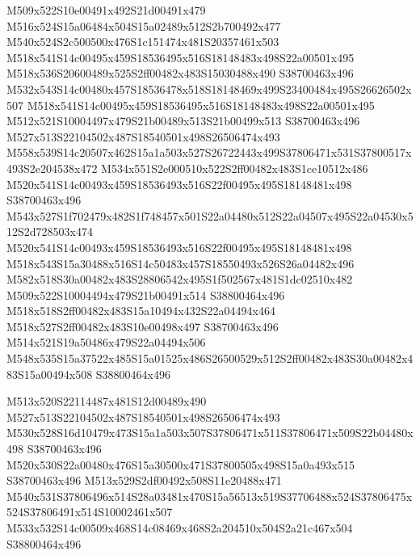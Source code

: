 \documentclass{article}
\begin{document}
\begin{multicols}{2}
M509x522S10e00491x492S21d00491x479 M516x524S15a06484x504S15a02489x512S2b700492x477 M540x524S2c500500x476S1c151474x481S20357461x503 M518x541S14c00495x459S18536495x516S18148483x498S22a00501x495 M518x536S20600489x525S2ff00482x483S15030488x490 S38700463x496 M532x543S14c00480x457S18536478x518S18148469x499S23400484x495S26626502x507 M518x541S14c00495x459S18536495x516S18148483x498S22a00501x495 M512x521S10004497x479S21b00489x513S21b00499x513 S38700463x496 M527x513S22104502x487S18540501x498S26506474x493 M558x539S14c20507x462S15a1a503x527S26722443x499S37806471x531S37800517x493S2e204538x472 M534x551S2e000510x522S2ff00482x483S1ce10512x486 M520x541S14c00493x459S18536493x516S22f00495x495S18148481x498 S38700463x496 M543x527S1f702479x482S1f748457x501S22a04480x512S22a04507x495S22a04530x512S2d728503x474 M520x541S14c00493x459S18536493x516S22f00495x495S18148481x498 M518x543S15a30488x516S14c50483x457S18550493x526S26a04482x496 M582x518S30a00482x483S28806542x495S1f502567x481S1dc02510x482 M509x522S10004494x479S21b00491x514 S38800464x496 M518x518S2ff00482x483S15a10494x432S22a04494x464 M518x527S2ff00482x483S10e00498x497 S38700463x496 M514x521S19a50486x479S22a04494x506 M548x535S15a37522x485S15a01525x486S26500529x512S2ff00482x483S30a00482x483S15a00494x508 S38800464x496

M513x520S22114487x481S12d00489x490 M527x513S22104502x487S18540501x498S26506474x493 M530x528S16d10479x473S15a1a503x507S37806471x511S37806471x509S22b04480x498 S38700463x496 M520x530S22a00480x476S15a30500x471S37800505x498S15a0a493x515 S38700463x496 M513x529S2df00492x508S11e20488x471 M540x531S37806496x514S28a03481x470S15a56513x519S37706488x524S37806475x524S37806491x514S10002461x507 M533x532S14c00509x468S14c08469x468S2a204510x504S2a21c467x504 S38800464x496


\end{multicols}
\end{document}
